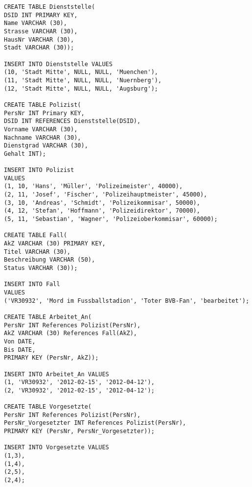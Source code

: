 \documentclass{lehramt-informatik-minimal}
\begin{document}
\begin{verbatim}
CREATE TABLE Dienststelle(
DSID INT PRIMARY KEY,
Name VARCHAR (30),
Strasse VARCHAR (30),
HausNr VARCHAR (30),
Stadt VARCHAR (30));

INSERT INTO Dienststelle VALUES
(10, 'Stadt Mitte', NULL, NULL, 'Muenchen'),
(11, 'Stadt Mitte', NULL, NULL, 'Nuernberg'),
(12, 'Stadt Mitte', NULL, NULL, 'Augsburg');

CREATE TABLE Polizist(
PersNr INT Primary KEY,
DSID INT REFERENCES Dienststelle(DSID),
Vorname VARCHAR (30),
Nachname VARCHAR (30),
Dienstgrad VARCHAR (30),
Gehalt INT);

INSERT INTO Polizist
VALUES
(1, 10, 'Hans', 'Müller', 'Polizeimeister', 40000),
(2, 11, 'Josef', 'Fischer', 'Polizeihauptmeister', 45000),
(3, 10, 'Andreas', 'Schmidt', 'Polizeikommisar', 50000),
(4, 12, 'Stefan', 'Hoffmann', 'Polizeidirektor', 70000),
(5, 11, 'Sebastian', 'Wagner', 'Polizeioberkommisar', 60000);

CREATE TABLE Fall(
AkZ VARCHAR (30) PRIMARY KEY,
Titel VARCHAR (30),
Beschreibung VARCHAR (50),
Status VARCHAR (30));

INSERT INTO Fall
VALUES
('VR30932', 'Mord im Fussballstadion', 'Toter BVB-Fan', 'bearbeitet');

CREATE TABLE Arbeitet_An(
PersNr INT References Polizist(PersNr),
AkZ VARCHAR (30) References Fall(AkZ),
Von DATE,
Bis DATE,
PRIMARY KEY (PersNr, AkZ));

INSERT INTO Arbeitet_An VALUES
(1, 'VR30932', '2012-02-15', '2012-04-12'),
(2, 'VR30932', '2012-02-15', '2012-04-12');

CREATE TABLE Vorgesetzte(
PersNr INT References Polizist(PersNr),
PersNr_Vorgesetzter INT References Polizist(PersNr),
PRIMARY KEY (PersNr, PersNr_Vorgesetzter));

INSERT INTO Vorgesetzte VALUES
(1,3),
(1,4),
(2,5),
(2,4);
\end{verbatim}
\end{document}
